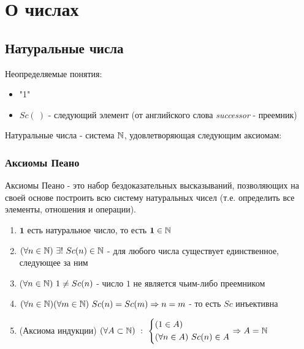 \section{О числах}

\subsection{Натуральные числа}

\begin{definition}
    Неопределяемые понятия:
    \begin{itemize}
        \item "1"
        \item $Sc(\ )$ - следующий элемент
            (от английского слова \textit{successor} - преемник)
    \end{itemize}
    
    Натуральные числа - система $\mathbb{N}$, удовлетворяющая
    следующим аксиомам:
\end{definition}

\subsubsection*{Аксиомы Пеано}

\begin{definition}
    Аксиомы Пеано - это набор бездоказательных
    высказываний, позволяющих на своей основе построить
    всю систему натуральных чисел (т.е. определить все
    элементы, отношения и операции).
\end{definition}

\begin{enumerate}
    \item $\mathbf{1}$ есть натуральное число, то есть
        $\mathbf{1} \in \mathbb{N}$
    \item $(\forall n \in \mathbb{N})\ \exists!\ Sc(n) \in \mathbb{N}$ - для
        любого числа существует единственное, следующее за ним
    \item ($\forall n \in \mathbb{N})\ 1 \neq Sc(n)$ - число $1$ не
        является чьим-либо преемником
    \item $(\forall n \in \N)(\forall m \in \N)\ 
        Sc(n) = Sc(m) \Ra n = m$ - то есть $Sc$ инъективна
    \item (Аксиома индукции) $(\forall A
        \subset \mathbb{N})\ :\  
        \left\{\begin{aligned}
            &(1 \in A)
            \\
            &(\forall n \in A)\ Sc(n) \in A
        \end{aligned}\right.
        \Rightarrow A = \mathbb{N}$
\end{enumerate}

